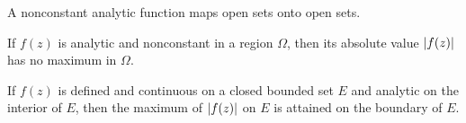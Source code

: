 \begin{corollary}
    A nonconstant analytic function maps open sets onto open sets.
\end{corollary}

\begin{theorem}
    If $f(z)$ is analytic and nonconstant in a region $\Omega$, then its absolute
    value $\left\vert f(z) \right\vert$ has no maximum in $\Omega$.
\end{theorem}

\begin{theorem}
    If $f(z)$ is defined and continuous on a closed bounded set $E$ and analytic
    on the interior of $E$, then the maximum of $\left\vert f(z) \right\vert$ on $E$ is attained
    on the boundary of $E$.
\end{theorem}
